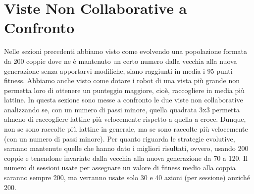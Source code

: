 \section{Viste Non Collaborative a Confronto}
Nelle sezioni precedenti abbiamo visto come evolvendo una popolazione formata da
200 coppie dove ne è mantenuto un certo numero dalla vecchia alla nuova
generazione senza apportarvi modifiche, siano raggiunti in media i 95 punti
fitness. Abbiamo anche visto come dotare i robot di una vista più grande non
permetta loro di ottenere un punteggio maggiore, cioè, raccogliere in media più
lattine.\newline
In questa sezione sono messe a confronto le due viste non collaborative
analizzando se, con un numero di passi minore, quella quadrata 3x3 permetta
almeno di raccogliere lattine più velocemente rispetto a quella a croce. Dunque,
non se sono raccolte più lattine in generale, ma se sono raccolte più
velocemente (con un numero di passi minore).\newline
Per quanto riguarda le strategie evolutive, saranno mantenute quelle che hanno
dato i migliori risultati, ovvero, usando 200 coppie e tenendone invariate dalla
vecchia alla nuova generazione da 70 a 120. Il numero di sessioni usate per
assegnare un valore di fitness medio alla coppia saranno sempre 200, ma verranno
usate solo 30 e 40 azioni (per sessione) anziché 200.

